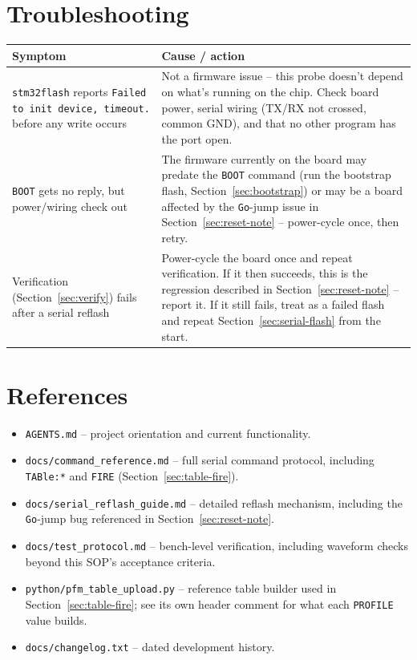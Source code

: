 \documentclass[11pt]{article}
\newcommand{\code}[1]{\texttt{#1}}
\begin{document}
\section{Troubleshooting}

\begin{center}
\begin{tabular}{p{1.7in} p{3in}}
  \hline
  \textbf{Symptom} & \textbf{Cause / action} \\
  \hline
  \code{stm32flash} reports \code{Failed to init device, timeout.}
    before any write occurs &
    Not a firmware issue -- this probe doesn't depend on what's running
    on the chip. Check board power, serial wiring (TX\slash RX not
    crossed, common GND), and that no other program has the port
    open. \\
  \code{BOOT} gets no reply, but power/wiring check out &
    The firmware currently on the board may predate the \code{BOOT}
    command (run the bootstrap flash, Section~\ref{sec:bootstrap}) or
    may be a board affected by the \code{Go}-jump issue in
    Section~\ref{sec:reset-note} -- power-cycle once, then retry. \\
  Verification (Section~\ref{sec:verify}) fails after a serial reflash &
    Power-cycle the board once and repeat verification. If it then
    succeeds, this is the regression described in
    Section~\ref{sec:reset-note} -- report it. If it still fails, treat
    as a failed flash and repeat Section~\ref{sec:serial-flash} from the
    start. \\
  \hline
\end{tabular}
\end{center}

\section{References}

\begin{itemize}
  \item \code{AGENTS.md} -- project orientation and current functionality.
  \item \code{docs/command\_reference.md} -- full serial command protocol,
    including \code{TABle:*} and \code{FIRE} (Section~\ref{sec:table-fire}).
  \item \code{docs/serial\_reflash\_guide.md} -- detailed reflash
    mechanism, including the \code{Go}-jump bug referenced in
    Section~\ref{sec:reset-note}.
  \item \code{docs/test\_protocol.md} -- bench-level verification,
    including waveform checks beyond this SOP's acceptance criteria.
  \item \code{python/pfm\_table\_upload.py} -- reference table builder
    used in Section~\ref{sec:table-fire}; see its own header comment
    for what each \code{PROFILE} value builds.
  \item \code{docs/changelog.txt} -- dated development history.
\end{itemize}
\end{document}
